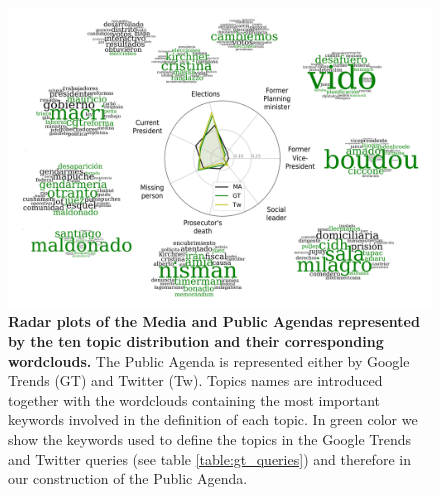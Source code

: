 \documentclass[a4paper, 12pt]{article}
\begin{document}
\begin{figure}[H]
\centering
\includegraphics[width = \textwidth]{images/Fig1.pdf}
\caption{\textbf{Radar plots of the Media and Public Agendas represented by the ten topic distribution and their corresponding wordclouds.} The Public Agenda is represented either by Google Trends (GT) and Twitter (Tw). 
Topics names are introduced together with the wordclouds containing the most important keywords involved in the definition of each topic. In green color we show the keywords used to define the topics in the Google Trends and Twitter queries (see table \ref{table:gt_queries}) and therefore in our construction of the Public Agenda.}
\label{fig:topics_wordclouds}
\end{figure}
\end{document}
